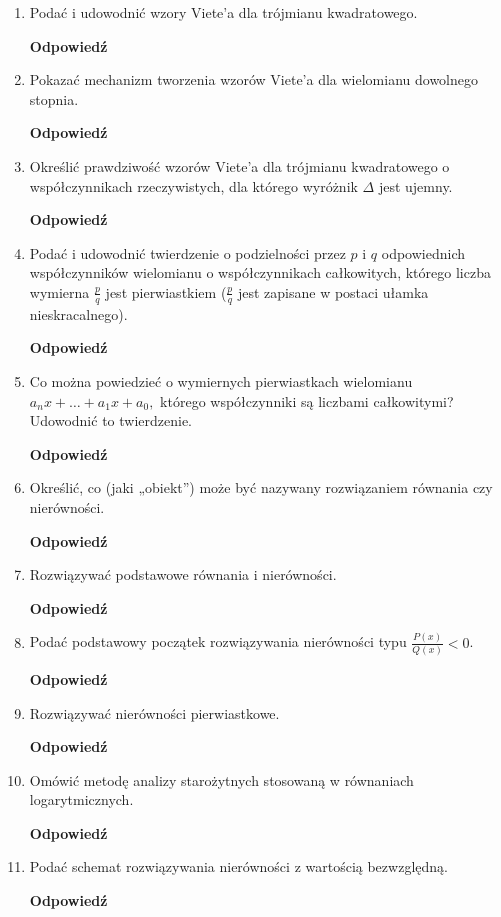 \documentclass[12pt,a4paper]{article}
\newcounter{twierdzenie}
\theoremstyle{break}
\newcommand{\Odp}[1]{
		\begin{mdframed}[style=zadanie]
			\textbf{Odpowiedź}\\
			#1
		\end{mdframed}
	}
\begin{document}
\begin{enumerate}[1.]
	\item Podać i udowodnić wzory Viete’a dla trójmianu kwadratowego.
	\Odp{
		
	}
	
	\item Pokazać mechanizm tworzenia wzorów Viete’a dla wielomianu dowolnego stopnia.
	\Odp{
		
	}
	
	\item Określić prawdziwość wzorów Viete’a dla trójmianu kwadratowego o współczynnikach rzeczywistych, dla którego wyróżnik $\Delta$ jest ujemny.
	\Odp{
		
	}

	\item Podać i udowodnić twierdzenie o podzielności przez $p$ i $q$ odpowiednich współczynników wielomianu o współczynnikach całkowitych, którego liczba wymierna $\frac{p}{q}$ jest pierwiastkiem ($\frac{p}{q}$ jest zapisane w postaci ułamka nieskracalnego).
	\Odp{
	
	}
	
	\item Co można powiedzieć o wymiernych pierwiastkach wielomianu $a_nx + \dots + a_1x + a_0,$ którego współczynniki są liczbami całkowitymi? Udowodnić to twierdzenie.
	\Odp{
	
	}
	
	\item Określić, co (jaki „obiekt”) może być nazywany rozwiązaniem równania czy nierówności.
	\Odp{
	
	}

	\item Rozwiązywać podstawowe równania i nierówności.
	\Odp{
	
	}
	
	\item Podać podstawowy początek rozwiązywania nierówności typu $\frac{P(x)}{Q(x)} < 0$.
	\Odp{
	
	}
	
	\item Rozwiązywać nierówności pierwiastkowe.
	\Odp{
	
	}
	
	\item Omówić metodę analizy starożytnych stosowaną w równaniach logarytmicznych.
	\Odp{
	
	}
	
	\item Podać schemat rozwiązywania nierówności z wartością bezwzględną.
	\Odp{
	
	}


\end{enumerate}
\end{document}
